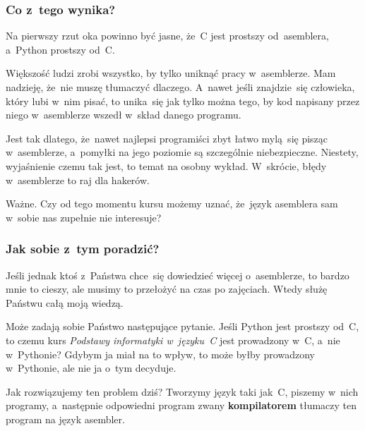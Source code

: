 \documentclass[10pt,t]{beamer}
\begin{document}
\begin{frame}
  \frametitle{Co z~tego wynika?}


  Na pierwszy rzut oka powinno być jasne, że~C jest prostszy od~asemblera,
  a~Python prostszy od~C.

  Większość ludzi zrobi wszystko, by tylko uniknąć pracy w~asemblerze.
  Mam nadzieję, że~nie muszę tłumaczyć dlaczego.  A~nawet jeśli
  znajdzie~się człowieka, który lubi w~nim pisać, to unika~się jak tylko
  można tego, by kod napisany przez niego w~asemblerze wszedł w~skład
  danego programu.

  Jest tak dlatego, że~nawet najlepsi programiści zbyt łatwo mylą~się
  pisząc w~asemblerze, a~pomyłki na jego poziomie są szczególnie
  niebezpieczne. Niestety, wyjaśnienie czemu tak jest, to temat na osobny
  wykład. W~skrócie, błędy w~asemblerze to raj dla hakerów.

  \alert{Ważne.} Czy od tego momentu kursu możemy uznać, że~język
  asemblera sam w~sobie nas zupełnie nie interesuje?

\end{frame}





\begin{frame}
  \frametitle{Jak sobie z~tym poradzić?}


  Jeśli jednak ktoś z~Państwa chce~się dowiedzieć więcej o~asemblerze,
  to bardzo mnie to cieszy, ale musimy to przełożyć na czas po zajęciach.
  Wtedy służę Państwu całą moją wiedzą.

  Może zadają sobie Państwo następujące pytanie. Jeśli Python jest prostszy
  od~C, to czemu kurs \textit{Podstawy informatyki w~języku~C} jest
  prowadzony w~C, a~nie w~Pythonie? Gdybym ja miał na to wpływ, to może
  byłby prowadzony w~Pythonie, ale nie ja o~tym decyduje.

  Jak rozwiązujemy ten problem dziś? Tworzymy język taki jak~C, piszemy
  w~nich programy, a~następnie odpowiedni program zwany
  \textbf{kompilatorem} tłumaczy ten program na język asembler.

\end{frame}
\end{document}
